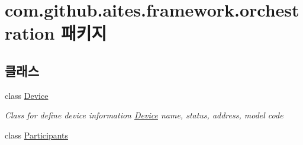 \hypertarget{namespacecom_1_1github_1_1aites_1_1framework_1_1orchestration}{}\section{com.\+github.\+aites.\+framework.\+orchestration 패키지}
\label{namespacecom_1_1github_1_1aites_1_1framework_1_1orchestration}
\subsection*{클래스}
\begin{DoxyCompactItemize}
\item 
class \mbox{\hyperlink{classcom_1_1github_1_1aites_1_1framework_1_1orchestration_1_1_device}{Device}}
\begin{DoxyCompactList}\small\item\em Class for define device information \mbox{\hyperlink{classcom_1_1github_1_1aites_1_1framework_1_1orchestration_1_1_device}{Device}} name, status, address, model code \end{DoxyCompactList}\item 
class \mbox{\hyperlink{classcom_1_1github_1_1aites_1_1framework_1_1orchestration_1_1_participants}{Participants}}
\end{DoxyCompactItemize}
